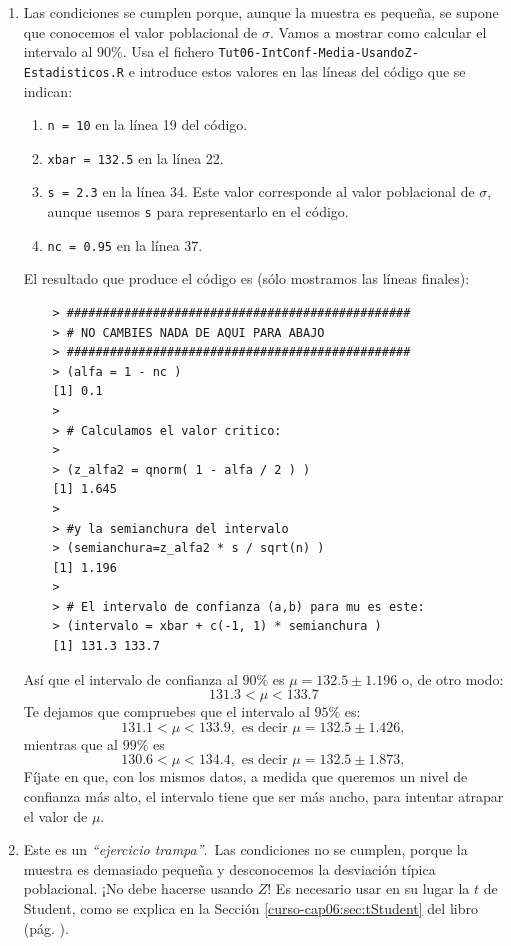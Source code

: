 \documentclass[10pt,a4paper]{article}\usepackage[]{graphicx}\usepackage[]{color}
\begin{document}
\begin{enumerate}
  \item Las condiciones se cumplen porque, aunque la muestra es pequeña, se supone que conocemos el valor poblacional de $\sigma$. Vamos a mostrar como calcular el intervalo al $90\%$. Usa el fichero {\tt Tut06-IntConf-Media-UsandoZ-Estadisticos.R} e introduce estos valores en las líneas del código que se indican:
    \begin{enumerate}
      \item {\tt n =  10} en la línea 19 del código.
      \item {\tt xbar =   132.5} en la línea 22.
      \item {\tt s =  2.3} en la línea 34. Este valor corresponde al valor poblacional de $\sigma$, aunque usemos {\tt s} para representarlo en el código.
      \item {\tt nc = 0.95} en la línea $37$.
    \end{enumerate}
    El resultado que produce el código es (sólo mostramos las líneas finales):
    \begin{center}
      \begin{verbatim}
    > ################################################
    > # NO CAMBIES NADA DE AQUI PARA ABAJO
    > ################################################
    > (alfa = 1 - nc )
    [1] 0.1
    >
    > # Calculamos el valor critico:
    >
    > (z_alfa2 = qnorm( 1 - alfa / 2 ) )
    [1] 1.645
    >
    > #y la semianchura del intervalo
    > (semianchura=z_alfa2 * s / sqrt(n) )
    [1] 1.196
    >
    > # El intervalo de confianza (a,b) para mu es este:
    > (intervalo = xbar + c(-1, 1) * semianchura )
    [1] 131.3 133.7
      \end{verbatim}
    \end{center}
    Así que el intervalo de confianza al $90\%$ es $\mu =  132.5\pm 1.196$ o, de otro modo:
    \[ 131.3 < \mu < 133.7\]
    Te dejamos que compruebes que el intervalo al $95\%$ es:
    \[131.1 < \mu < 133.9, \mbox{ es decir }\mu =  132.5\pm 1.426,\]
    mientras que al $99\%$ es
    \[130.6 < \mu < 134.4, \mbox{ es decir }\mu =  132.5\pm 1.873,\]
   Fíjate en que, con los mismos datos, a medida que queremos un nivel de confianza más alto, el intervalo tiene que ser más ancho, para intentar atrapar el valor de $\mu$.
  \item Este es un {\em ``ejercicio trampa''}.\, Las condiciones no se cumplen, porque la muestra es demasiado pequeña y desconocemos la desviación típica poblacional. ¡No debe hacerse usando $Z$! Es necesario usar en su lugar la $t$ de Student, como se explica en la Sección \ref{curso-cap06:sec:tStudent} del libro (pág. \pageref{curso-cap06:sec:tStudent}).

\end{enumerate}
\end{document}
